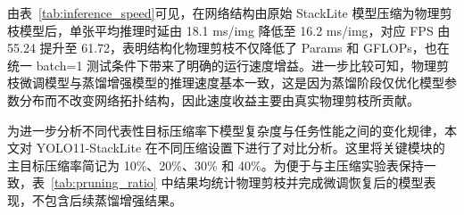由表~\ref{tab:inference_speed}可见，在网络结构由原始 StackLite 模型压缩为物理剪枝模型后，单张平均推理时延由 18.1 ms/img 降低至 16.2 ms/img，对应 FPS 由 55.24 提升至 61.72，表明结构化物理剪枝不仅降低了 Params 和 GFLOPs，也在统一 batch=1 测试条件下带来了明确的运行速度增益。进一步比较可知，物理剪枝微调模型与蒸馏增强模型的推理速度基本一致，这是因为蒸馏阶段仅优化模型参数分布而不改变网络拓扑结构，因此速度收益主要由真实物理剪枝所贡献。

为进一步分析不同代表性目标压缩率下模型复杂度与任务性能之间的变化规律，本文对 YOLO11-StackLite 在不同压缩设置下进行了对比分析。这里将关键模块的主目标压缩率简记为 10\%、20\%、30\% 和 40\%。为便于与主压缩实验表保持一致，表~\ref{tab:pruning_ratio} 中结果均统计物理剪枝并完成微调恢复后的模型表现，不包含后续蒸馏增强结果。

\begin{table}[htbp]
  \label{tab:pruning_ratio}
  \centering
  \small
\end{table}

